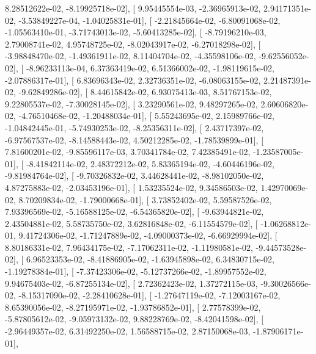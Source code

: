 \documentclass{article}
\begin{document}
          8.28512622e-02,  -8.19925718e-02],
       [  9.95445554e-03,  -2.36965913e-02,   2.94171351e-02,
         -3.53849227e-04,  -1.04025831e-01],
       [ -2.21845664e-02,  -6.80091068e-02,  -1.05563410e-01,
         -3.71743013e-02,  -5.60413285e-02],
       [ -8.79196210e-03,   2.79008741e-02,   4.95748725e-02,
         -8.02043917e-02,  -6.27018298e-02],
       [ -3.98848470e-02,  -1.49361911e-02,   8.11404704e-02,
         -4.35598106e-02,  -9.62556052e-02],
       [ -8.96233113e-04,   6.37363419e-02,   6.51366002e-02,
         -1.98119615e-02,  -2.07886317e-01],
       [  6.83696343e-02,   2.32736351e-02,  -6.08063155e-02,
          2.21487391e-02,  -9.62849286e-02],
       [  8.44615842e-02,   6.93075413e-03,   8.51767153e-02,
          9.22805537e-02,  -7.30028145e-02],
       [  3.23290561e-02,   9.48297265e-02,   2.60606820e-02,
         -4.76510468e-02,  -1.20488034e-01],
       [  5.55243695e-02,   2.15989766e-02,  -1.04842445e-01,
         -5.74930253e-02,  -8.25356311e-02],
       [  2.43717397e-02,  -6.97567537e-02,  -8.14588443e-02,
          4.50212285e-02,  -1.78539899e-01],
       [  7.81600201e-02,  -9.85596117e-03,   3.70341784e-02,
          7.42385491e-02,  -1.23587005e-01],
       [ -8.41842114e-02,   2.48372212e-02,   5.83365194e-02,
         -4.60446196e-02,  -9.81984764e-02],
       [ -9.70326832e-02,   3.44628441e-02,  -8.98102050e-02,
          4.87275883e-02,  -2.03453196e-01],
       [  1.53235524e-02,   9.34586503e-02,   1.42970069e-02,
          8.70209834e-02,  -1.79000668e-01],
       [  3.73852402e-02,   5.59587526e-02,   7.93396569e-02,
         -5.16588125e-02,  -6.54365820e-02],
       [ -9.63944821e-02,   2.43504881e-02,   5.58735750e-02,
          3.62816848e-02,  -6.11554579e-02],
       [ -1.06268812e-01,   9.41724306e-02,  -1.71247889e-02,
         -4.09000373e-02,  -6.66929994e-02],
       [  8.80186331e-02,   7.96434175e-02,  -7.17062311e-02,
         -1.11980581e-02,  -9.44573528e-02],
       [  6.96523353e-02,  -8.41886905e-02,  -1.63945898e-02,
          6.34830715e-02,  -1.19278384e-01],
       [ -7.37423306e-02,  -5.12737266e-02,  -1.89957552e-02,
          9.94675403e-02,  -6.87255134e-02],
       [  2.72362423e-02,   1.37272115e-03,  -9.30026566e-02,
         -8.15317090e-02,  -2.28410628e-01],
       [ -1.27647119e-02,  -7.12003167e-02,   8.65390056e-02,
         -8.27195971e-02,  -1.93786852e-01],
       [  2.77578399e-02,  -5.87805612e-02,  -9.05973132e-02,
          9.88228769e-02,  -8.42041598e-02],
       [ -2.96449357e-02,   6.31492250e-02,   1.56588715e-02,
          2.87150068e-03,  -1.87906171e-01],
\end{document}
